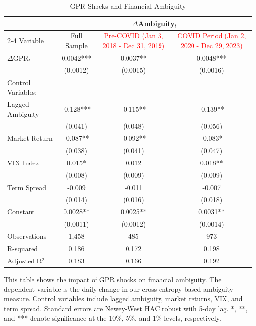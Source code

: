 \documentclass[preprint,12pt,authoryear]{elsarticle}
\begin{document}
\begin{table}[htbp]
\centering
\caption{GPR Shocks and Financial Ambiguity}
\label{tab:gpr_ambiguity}
\begin{threeparttable}
\begin{tabular*}{\textwidth}{@{\extracolsep{\fill}} lccc @{\extracolsep{\fill}}}
\toprule
& \multicolumn{3}{c}{$\Delta$Ambiguity$_t$} \\
\cmidrule(lr){2-4}
Variable & Full Sample & \textcolor{red}{Pre-COVID (Jan 3, 2018 - Dec 31, 2019)} & \textcolor{red}{COVID Period (Jan 2, 2020 - Dec 29, 2023)} \\
\midrule
\midrule
$\Delta$GPR$_t$ & 0.0042*** & 0.0037** & 0.0048*** \\
& (0.0012) & (0.0015) & (0.0016) \\
\midrule
Control Variables: & & & \\
Lagged Ambiguity & -0.128*** & -0.115** & -0.139** \\
& (0.041) & (0.048) & (0.056) \\
Market Return & -0.087** & -0.092** & -0.083* \\
& (0.038) & (0.041) & (0.047) \\
VIX Index & 0.015* & 0.012 & 0.018** \\
& (0.008) & (0.009) & (0.009) \\
Term Spread & -0.009 & -0.011 & -0.007 \\
& (0.014) & (0.016) & (0.018) \\
\midrule
Constant & 0.0028** & 0.0025** & 0.0031** \\
& (0.0011) & (0.0012) & (0.0014) \\
\midrule
Observations & 1,458 & 485 & 973 \\
R-squared & 0.186 & 0.172 & 0.198 \\
Adjusted R$^2$ & 0.183 & 0.166 & 0.192 \\
\bottomrule
\end{tabular*}
\begin{tablenotes}[flushleft]
\small
\item[] This table shows the impact of GPR shocks on financial ambiguity. The dependent variable is the daily change in our cross-entropy-based ambiguity measure. Control variables include lagged ambiguity, market returns, VIX, and term spread. Standard errors are Newey-West HAC robust with 5-day lag. *, **, and *** denote significance at the 10\%, 5\%, and 1\% levels, respectively.
\end{tablenotes}
\end{threeparttable}
\end{table}
\end{document}
